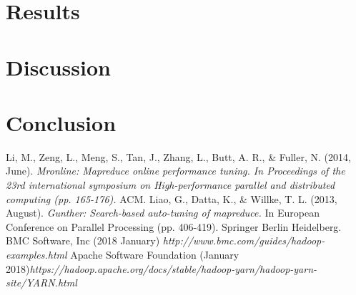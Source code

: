\documentclass[a4paper,english]{report}
\begin{document}
	\chapter{Results}
	\chapter{Discussion}
	\chapter{Conclusion}
	\begin{thebibliography}{1}
		Li, M., Zeng, L., Meng, S., Tan, J., Zhang, L., Butt, A. R., \& Fuller, N. (2014, June). \emph{Mronline: Mapreduce online performance tuning. In Proceedings of the 23rd international symposium on High-performance parallel and distributed computing (pp. 165-176).} ACM.
		Liao, G., Datta, K., \& Willke, T. L. (2013, August). \emph{Gunther: Search-based auto-tuning of mapreduce.} In European Conference on Parallel Processing (pp. 406-419). Springer Berlin Heidelberg.
		BMC Software, Inc (2018 January) \emph{http://www.bmc.com/guides/hadoop-examples.html}
		Apache Software Foundation (January 2018)\emph{https://hadoop.apache.org/docs/stable/hadoop-yarn/hadoop-yarn-site/YARN.html}
	\end{thebibliography}
\end{document}
